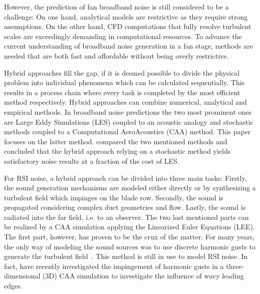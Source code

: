 However, the prediction of fan broadband noise is still considered to be a challenge:  On one hand, analytical models are restrictive as they require strong assumptions.  On the other hand, CFD computations that fully resolve turbulent scales are exceedingly demanding in computational resources.   To advance the current understanding of broadband noise generation in a fan stage, methods are needed that are both fast and affordable without being overly restrictive.

Hybrid approaches fill the gap, if it is deemed possible to divide the physical problem into individual phenomena which can be calculated sequentially. This results in a process chain where every task is completed by the most efficient method respectively.  Hybrid approaches can combine numerical, analytical and empirical methods. In broadband noise predictions the two most prominent ones are Large Eddy Simulations (LES) coupled to an acoustic analogy and stochastic methods coupled to a Computational AeroAcoustics (CAA) method. This paper focuses on the latter method. \citet{allan_comparison_2014} compared the two mentioned methods and concluded that the hybrid approach relying on a stochastic method yields satisfactory noise results at a fraction of the cost of LES.

For RSI noise, a hybrid approach can be divided into three main tasks: Firstly, the sound generation mechanisms are modeled either directly or by synthesizing a turbulent field which impinges on the blade row.  Secondly, the sound is propagated considering complex duct geometries and flow. Lastly, the sound is radiated into the far field, i.e. to an observer.  The two last mentioned parts can be realized by a CAA simulation applying the Linearized Euler Equations (LEE). %
The first part, however, has proven to be the crux of the matter. For many years, the only way of modeling the sound sources was to use discrete harmonic gusts to generate the turbulent field~\cite{amiet_high_1976,scott_finite-difference_1995,peake_influence_2004,glegg_panel_2010}.  This method is still in use to model RSI noise. In fact, \citet{lau_effect_2013} have recently investigated the impingement of harmonic gusts in a three-dimensional (3D) CAA simulation to investigate the influence of wavy leading edges.

